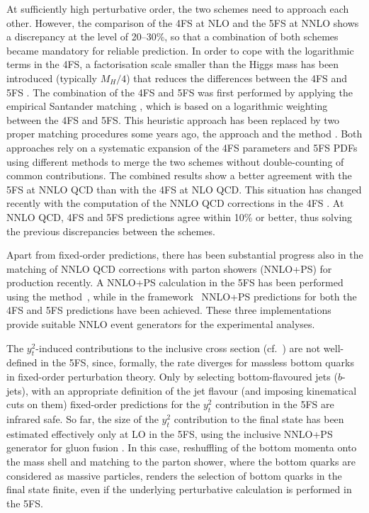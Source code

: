 \documentclass[11pt,a4paper]{article}
\begin{document}
At sufficiently high perturbative order, the two schemes need to approach each other. However, the comparison of the 4FS at NLO and the 5FS at NNLO shows a discrepancy at the level of 20--30\%, so that a combination of both schemes became mandatory for reliable prediction. In order to cope with the logarithmic terms in the 4FS, a factorisation scale smaller than the Higgs mass has been introduced (typically $M_H/4$) that reduces the differences between the 4FS and 5FS \cite{campbell2004,Maltoni:2012pa}. The combination of the 4FS and 5FS was first performed by applying the empirical Santander matching \cite{harlander:2011aa}, which is based on a logarithmic weighting between the 4FS and 5FS. This heuristic approach has been replaced by two proper matching procedures some years ago, the \fonll{} approach \cite{forte:2015hba,forte:2016sja} and the \nlonnllpart{} method \cite{Bonvini:2015pxa,Bonvini:2016fgf}. Both approaches rely on a systematic expansion of the 4FS parameters and 5FS PDFs using different methods to merge the two schemes without double-counting of common contributions. The 
combined results show a better agreement with the 5FS at NNLO QCD than with the 4FS at NLO QCD. This situation has changed recently with the computation
of the NNLO QCD corrections in the 4FS \cite{Biello:2024pgo}. At NNLO QCD, 4FS and 5FS predictions agree within 10\% or better, thus solving 
the previous discrepancies between the schemes.

Apart from fixed-order predictions, there has been substantial progress also in the matching of NNLO QCD corrections with parton showers (NNLO+PS) for \bbH{} production recently.
A NNLO+PS calculation in the 5FS has been performed using the \GENEVA{} method~\cite{Gavardi:2025zpf}, while in the \minnlo{} framework~\cite{Biello:2024pgo,Biello:2024vdh} NNLO+PS predictions for both the 4FS and 5FS predictions have been achieved. 
These three implementations provide suitable NNLO event generators for the experimental analyses.

The $y_t^2$-induced contributions to the inclusive \bbH{} cross section (cf.\ ) are not well-defined in the 5FS, since, formally, the rate diverges 
for massless bottom quarks in fixed-order perturbation theory. Only by selecting bottom-flavoured jets ($b$-jets), with an appropriate
definition of the jet flavour (and imposing kinematical cuts on them) fixed-order predictions for the $y_t^2$ contribution in the 5FS are infrared safe. So far, the size of the 
$y_t^2$ contribution to the \bbH{} final state has been estimated effectively only at LO in the 5FS, using the inclusive NNLO+PS 
generator for gluon fusion \cite{hamilton:2012rf,hamilton:2013fea,hamilton:2015nsa}. In this case, reshuffling of the bottom momenta onto the mass shell and matching to the parton shower, 
where the bottom quarks are considered as massive particles, renders the selection of bottom quarks in the final state finite, even if the 
underlying perturbative calculation is performed in the 5FS.
\end{document}
